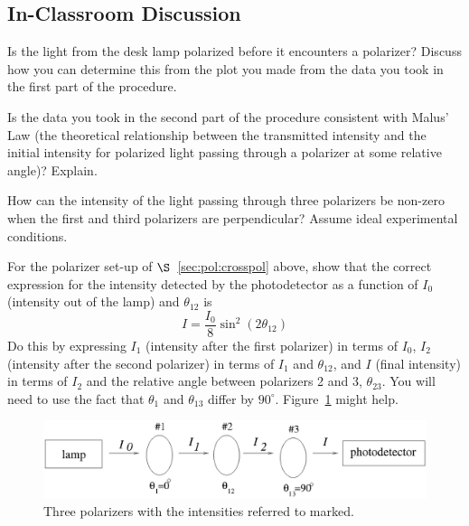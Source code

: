 \subsection{In-Classroom Discussion}

Is the light from the desk lamp polarized before it encounters a polarizer? Discuss
how you can determine this from the plot you made from the data you took in the first
part of the procedure.
\vspace*{4cm}

\noindent
Is the data you took in the second part of the procedure consistent with Malus' Law (the theoretical relationship between 
the transmitted intensity and the initial intensity for polarized light passing
through a polarizer at some relative angle)?
Explain.
\vspace*{4cm}

\noindent
How can the intensity of the light passing through three polarizers be non-zero when
the first and third polarizers are perpendicular? Assume ideal experimental conditions.
\vspace*{14cm}

\noindent
For the polarizer set-up of $\S$~\ref{sec:pol:crosspol} above, show that the 
correct expression for the intensity detected by the photodetector as a 
function of $I_0$ (intensity out of the lamp) and $\theta_{12}$ is 
\begin{equation}
I=\frac{I_0}{8}\sin^2(2\theta_{12})  \label{eq:pol:addq}
\end{equation}
Do this by expressing $I_1$ (intensity after the first polarizer) in terms of 
$I_0$, $I_2$ (intensity after the second polarizer) in terms of $I_1$
and $\theta_{12}$, and $I$ (final intensity) in terms of $I_2$ and the 
relative angle between polarizers 2 and 3, $\theta_{23}$.  You will need to 
use the fact that $\theta_1$ and $\theta_{13}$ differ by $90^\circ$. 
Figure~\ref{fig:pol:threepolintens} might help.
\begin{figure}[htb]
\centering 
\epsfxsize=11cm \includegraphics[scale=0.8]{7_polarization/threepolintens.eps}
\caption{Three polarizers with the intensities referred to marked.}
\label{fig:pol:threepolintens}
\end{figure}
	

